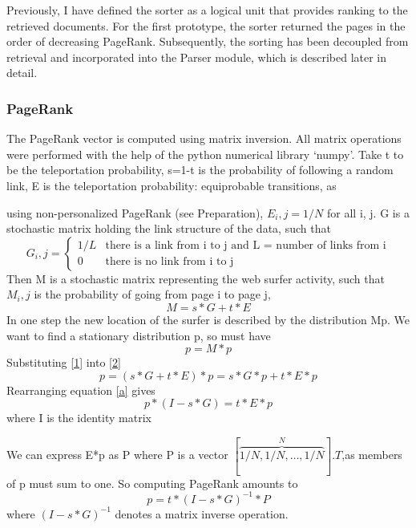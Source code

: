 \documentclass[12pt,notitlepage,twoside]{scrreprt}
\begin{document}
Previously, I have defined the sorter as a logical unit that provides ranking
to the retrieved documents. For the first prototype, the sorter returned the
pages in the order of decreasing PageRank.  Subsequently, the sorting has been
decoupled from retrieval and incorporated into the Parser module, which is
described later in detail.

\subsubsection*{PageRank} 
The PageRank vector is computed using matrix inversion. All matrix operations
were performed with the help of the python numerical library `numpy'.  Take t
to be the teleportation probability, s=1-t is the probability of following a
random link, E is the teleportation probability: equiprobable transitions, as

using non-personalized PageRank (see Preparation), \(E_i,j = 1/N\) for all i,
j. G is a stochastic matrix holding the link structure of the data, such that 
\begin{equation*}
  G_i,j = \begin{cases}
    1/L & \text{there is a link from i to j and L = number of links from i}\\
    0   & \text{there is no link from i to j}
  \end{cases}
\end{equation*}
Then M is a stochastic matrix representing the web surfer activity, such
that \(M_i,j\) is the probability of going from page i to page j, 
\begin{equation} \label{1}
  M = s*G +t*E
\end{equation}
In one step the new location of the surfer is described by the distribution Mp.
We want to find a stationary distribution p, so must have
\begin{equation}\label{2}
  p = M*p
\end{equation}
Substituting \ref{1} into \ref{2}
\begin{equation} \label{a}
  p = (s*G+t*E)*p = s*G*p + t*E*p
\end{equation}
Rearranging equation \ref{a} gives
\begin{equation}
  p*(I-s*G) = t*E*p
\end{equation}
where I is the identity matrix

We can express E*p as P where P is a vector
\([\overbrace{1/N,1/N,\dots,1/N}^N].T\),as members of p must sum to one.
So computing PageRank amounts to
\begin{equation}
p  = t*(I-s*G)^{-1}*P
\end{equation}
where \((I-s*G)^{-1}\) denotes a matrix inverse operation.
\end{document}
